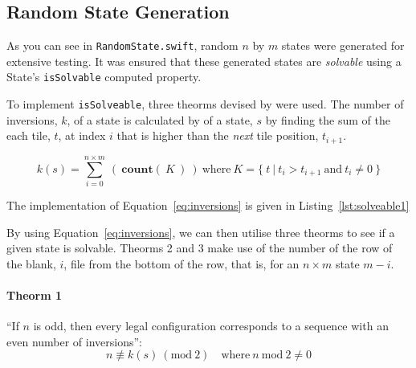 

\subsection{Random State Generation}
\label{sub:random state generation}

As you can see in \texttt{RandomState.swift}, random $n$ by $m$ states were
generated for extensive testing. It was ensured that these generated states are
\emph{solvable} using a State's \texttt{isSolvable} computed property.

To implement \texttt{isSolveable}, three theorms devised by
\citeauthor{gong2000} were used. The number of inversions, $k$, of a state is
calculated by of a state, $s$ by finding the sum of the each tile, $t$, at index
$i$ that is higher than the \emph{next} tile position, $t_{i+1}$.

\begin{equation}\label{eq:inversions}
  k(s) = \sum_{i=0}^{n \times m} \ ( \
    \mathbf{ count } ( \ K \ )
  \ ) \ \text{where} \ K = \{ \ t \ | \ t_{i} > t_{i+1} \ \text{and} \ t_{i} \neq 0 \ \}
\end{equation}

The implementation of Equation~\ref{eq:inversions} is given in Listing~\ref{lst:solveable1}



By using Equation~\ref{eq:inversions}, we can then utilise three theorms to see
if a given state is solvable. Theorms 2 and 3 make use of the number of
the row of the blank, $i$, file from the bottom of the row, that is, for an $n \times m$
state $m - i$.

\paragraph{Theorm 1}
\label{par:Theorm 1}

``If $n$ is odd, then every legal configuration corresponds to a sequence with an even number of inversions'':
\begin{equation}
  n \not\equiv k(s) \ (\text{mod}\ 2) \quad \text{where} \ n \ \text{mod} \ 2 \neq 0
\end{equation}

